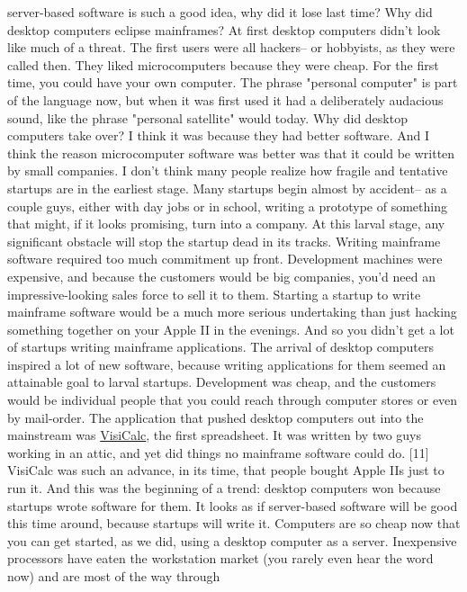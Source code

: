 server-based software is such a good idea, why did it lose last
time?  Why did desktop computers eclipse mainframes?
At first desktop computers didn't look like much of a threat.  The
first users were all hackers-- or hobbyists, as they were called
then.  They liked microcomputers because they were cheap.  For the
first time, you could have your own computer.  The phrase "personal
computer" is part of the language now, but when it was first used
it had a deliberately audacious sound, like the phrase "personal
satellite" would today.
Why did desktop computers take over? I think it was because they
had better software.  And I think the reason microcomputer software
was better was that it could be written by small companies.
I don't think many people realize how fragile and tentative startups
are in the earliest stage.  Many startups begin almost by accident--
as a couple guys, either with day jobs or in school, writing a
prototype of something that might, if it looks promising, turn into
a company. At this larval stage, any significant obstacle will stop
the startup dead in its tracks.  Writing mainframe software required
too much commitment up front.  Development machines were expensive,
and because the customers would be big companies, you'd need an
impressive-looking sales force to sell it to them.  Starting a
startup to write mainframe software would be a much more serious
undertaking than just hacking something together on your Apple II
in the evenings.  And so you didn't get a lot of startups writing
mainframe applications.
The arrival of desktop computers inspired a lot of new software,
because writing applications for them seemed an attainable goal to
larval startups.  Development was cheap, and the customers would
be individual people that you could reach through computer stores
or even by mail-order.
The application that pushed desktop computers out into the mainstream
was \href{http://www.bricklin.com/visicalc.htm}{VisiCalc}, the 
first spreadsheet.  It was written by two guys
working in an attic, and yet did things no mainframe software could
do. [11]  VisiCalc was such an advance, in its time, that people
bought Apple IIs just to run it.  And this was the beginning of a
trend: desktop computers won because startups wrote software for
them.
It looks as if server-based software will be good this time around,
because startups will write it.  Computers are so cheap now that
you can get started, as we did, using a desktop computer as a
server.  Inexpensive processors have eaten the workstation market
(you rarely even hear the word now) and are most of the way through
